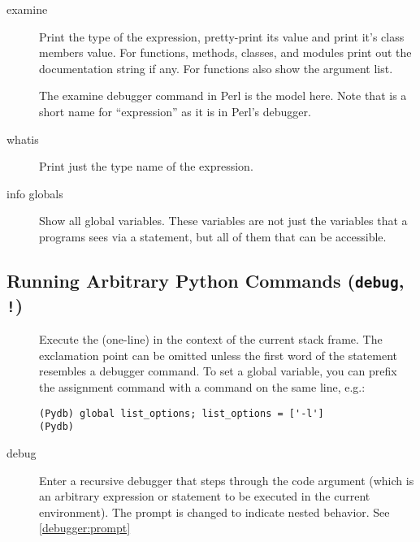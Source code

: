 \begin{description}
\item[examine ]\label{command:examine}

Print the type of the expression, pretty-print its value and print
it's class members value.  For functions, methods, classes, and
modules print out the documentation string if any.  For functions also
show the argument list.

The examine debugger command in Perl is the model here. Note that
 is a short name for ``expression'' as it is in Perl's
debugger.

\item[whatis ]\label{command:whatis}

Print just the type name of the expression.

\item[info globals]\label{command:info-globals}

Show all global variables. These variables are not just the variables
that a programs sees via a  statement, but all of them
that can be accessible.

\end{description}

\subsection{Running Arbitrary Python Commands ({\tt debug}, {\tt !})\label{subsection-commands}}

\begin{description}

\item[\optional{!}]

Execute the (one-line)  in the context of
the current stack frame.
The exclamation point can be omitted unless the first word
of the statement resembles a debugger command.
To set a global variable, you can prefix the assignment
command with a  command on the same line, e.g.:

\begin{verbatim}
(Pydb) global list_options; list_options = ['-l']
(Pydb)
\end{verbatim}

\item[debug ]

Enter a recursive debugger that steps through the code argument (which
is an arbitrary expression or statement to be executed in the current
environment). The prompt is changed to indicate nested behavior. See
\ref{debugger:prompt}

\end{description}

